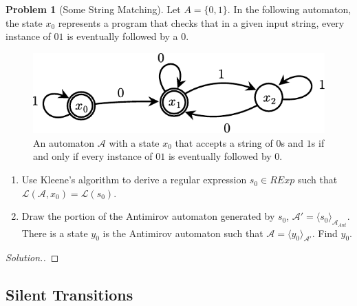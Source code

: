 \documentclass[11pt]{article}
\theoremstyle{theorem} %
\theoremstyle{definition} %
\newtheorem{problem}                    {{\color{BurntOrange}Problem}}
\theoremstyle{remark} %
\begin{document}
\begin{problem}
    [Some String Matching]
    Let \(A = \{0,1\}\).
    In the following automaton, the state \(x_0\) represents a program that checks that in a given input string, every instance of \(01\) is eventually followed by a \(0\).

    \begin{figure}[h]
        \centering
        \includegraphics{01then0.pdf}
        \caption{An automaton \(\mathcal A\) with a state \(x_0\) that accepts a string of \(0\)s and \(1\)s if and only if every instance of \(01\) is eventually followed by \(0\).}
    \end{figure}

    \begin{enumerate}
        \item Use Kleene's algorithm to derive a regular expression \(s_0 \in \mathit{RExp}\) such that \(\mathcal L(\mathcal A, x_0) = \mathcal L(s_0)\).
        
        \item 
            Draw the portion of the Antimirov automaton generated by \(s_0\), \(\mathcal A' = \langle s_0\rangle_{\mathcal A_{Ant}}\). 
            There is a state \(y_0\) is the Antimirov automaton such that \(\mathcal A = \langle y_0\rangle_{\mathcal A'}\).
            Find \(y_0\).
    \end{enumerate}
\end{problem}

\begin{proof}[Solution.]
    
\end{proof}


\subsection*{Silent Transitions}
\end{document}

